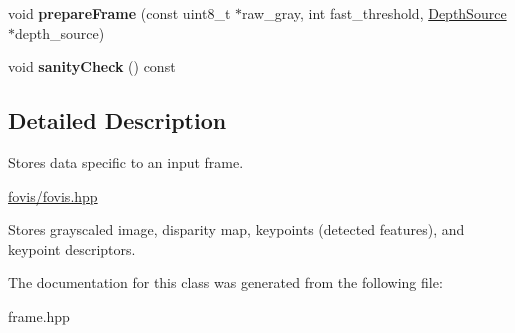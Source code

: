 \begin{DoxyCompactItemize}
\item 
\hypertarget{classfovis_1_1OdometryFrame_a681bd541c8e022181cc253410f0db82a}{
void {\bfseries prepareFrame} (const uint8\_\-t $\ast$raw\_\-gray, int fast\_\-threshold, \hyperlink{classfovis_1_1DepthSource}{DepthSource} $\ast$depth\_\-source)}
\label{classfovis_1_1OdometryFrame_a681bd541c8e022181cc253410f0db82a}

\item 
\hypertarget{classfovis_1_1OdometryFrame_a892c8032392efdef960a30a2e8cd817c}{
void {\bfseries sanityCheck} () const }
\label{classfovis_1_1OdometryFrame_a892c8032392efdef960a30a2e8cd817c}

\end{DoxyCompactItemize}


\subsection{Detailed Description}
Stores data specific to an input frame. 

\hyperlink{fovis_8hpp_source}{fovis/fovis.hpp}

Stores grayscaled image, disparity map, keypoints (detected features), and keypoint descriptors. 

The documentation for this class was generated from the following file:\begin{DoxyCompactItemize}
\item 
frame.hpp\end{DoxyCompactItemize}
